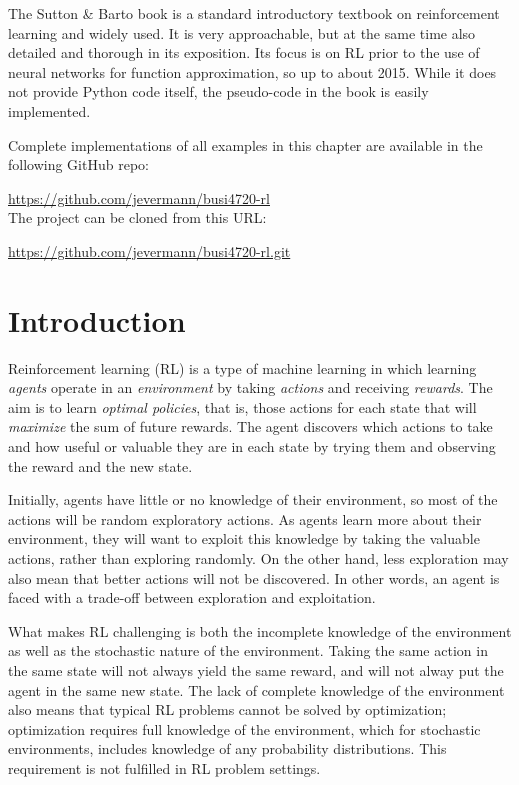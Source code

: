 The Sutton \& Barto book is a standard introductory textbook on reinforcement learning and widely used. It is very approachable, but at the same time also detailed and thorough in its exposition. Its focus is on RL prior to the use of neural networks for function approximation, so up to about 2015. While it does not provide Python code itself, the pseudo-code in the book is easily implemented.

\begin{resourcebox}
Complete implementations of all examples in this chapter are available in the following GitHub repo:

\url{https://github.com/jevermann/busi4720-rl} \\

The project can be cloned from this URL:

\url{https://github.com/jevermann/busi4720-rl.git}
\end{resourcebox}


\section{Introduction}

Reinforcement learning (RL) is a type of machine learning in which learning \emph{agents} operate in an \emph{environment} by taking \emph{actions} and receiving \emph{rewards}. The aim is to learn \emph{optimal policies}, that is, those actions for each state that will \emph{maximize} the sum of future rewards. The agent discovers which actions to take and how useful or valuable they are in each state by trying them and observing the reward and the new state. 

Initially, agents have little or no knowledge of their environment, so most of the actions will be random exploratory actions. As agents learn more about their environment, they will want to exploit this knowledge by taking the valuable actions, rather than exploring randomly. On the other hand, less exploration may also mean that better actions will not be discovered. In other words, an agent is faced with a trade-off between exploration and exploitation.

What makes RL challenging is both the incomplete knowledge of the environment as well as the stochastic nature of the environment. Taking the same action in the same state will not always yield the same reward, and will not alway put the agent in the same new state. The lack of complete knowledge of the environment also means that typical RL problems cannot be solved by optimization; optimization requires full knowledge of the environment, which for stochastic environments, includes knowledge of any probability distributions. This requirement is not fulfilled in RL problem settings.


